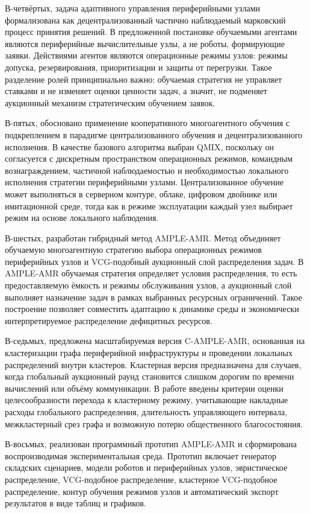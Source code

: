 В-четвёртых, задача адаптивного управления периферийными узлами формализована как децентрализованный частично наблюдаемый марковский процесс принятия решений. В предложенной постановке обучаемыми агентами являются периферийные вычислительные узлы, а не роботы, формирующие заявки. Действиями агентов являются операционные режимы узлов: режимы допуска, резервирования, приоритизации и защиты от перегрузки. Такое разделение ролей принципиально важно: обучаемая стратегия не управляет ставками и не изменяет оценки ценности задач, а значит, не подменяет аукционный механизм стратегическим обучением заявок.

В-пятых, обосновано применение кооперативного многоагентного обучения с подкреплением в парадигме централизованного обучения и децентрализованного исполнения. В качестве базового алгоритма выбран QMIX, поскольку он согласуется с дискретным пространством операционных режимов, командным вознаграждением, частичной наблюдаемостью и необходимостью локального исполнения стратегии периферийными узлами. Централизованное обучение может выполняться в серверном контуре, облаке, цифровом двойнике или имитационной среде, тогда как в режиме эксплуатации каждый узел выбирает режим на основе локального наблюдения.

В-шестых, разработан гибридный метод AMPLE-AMR. Метод объединяет обучаемую многоагентную стратегию выбора операционных режимов периферийных узлов и VCG-подобный аукционный слой распределения задач. В AMPLE-AMR обучаемая стратегия определяет условия распределения, то есть предоставляемую ёмкость и режимы обслуживания узлов, а аукционный слой выполняет назначение задач в рамках выбранных ресурсных ограничений. Такое построение позволяет совместить адаптацию к динамике среды и экономически интерпретируемое распределение дефицитных ресурсов.

В-седьмых, предложена масштабируемая версия C-AMPLE-AMR, основанная на кластеризации графа периферийной инфраструктуры и проведении локальных распределений внутри кластеров. Кластерная версия предназначена для случаев, когда глобальный аукционный раунд становится слишком дорогим по времени вычислений или объёму коммуникации. В работе введены критерии оценки целесообразности перехода к кластерному режиму, учитывающие накладные расходы глобального распределения, длительность управляющего интервала, межкластерный срез графа и возможную потерю общественного благосостояния.

В-восьмых, реализован программный прототип AMPLE-AMR и сформирована воспроизводимая экспериментальная среда. Прототип включает генератор складских сценариев, модели роботов и периферийных узлов, эвристическое распределение, VCG-подобное распределение, кластерное VCG-подобное распределение, контур обучения режимов узлов и автоматический экспорт результатов в виде таблиц и графиков.

